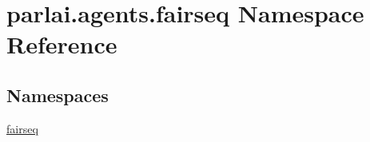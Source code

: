 \hypertarget{namespaceparlai_1_1agents_1_1fairseq}{}\section{parlai.\+agents.\+fairseq Namespace Reference}
\label{namespaceparlai_1_1agents_1_1fairseq}
\subsection*{Namespaces}
\begin{DoxyCompactItemize}
\item 
 \hyperlink{namespaceparlai_1_1agents_1_1fairseq_1_1fairseq}{fairseq}
\end{DoxyCompactItemize}
